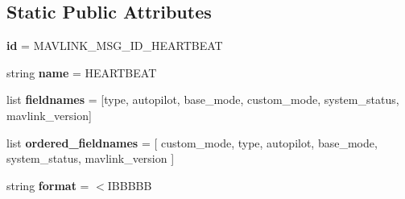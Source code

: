 \subsection*{Static Public Attributes}
\begin{DoxyCompactItemize}
\item 
\mbox{\label{classpymavlink_1_1dialects_1_1v10_1_1MAVLink__heartbeat__message_a91f87b960c3a9e12a26f72f2db11935c}} 
{\bfseries id} = M\+A\+V\+L\+I\+N\+K\+\_\+\+M\+S\+G\+\_\+\+I\+D\+\_\+\+H\+E\+A\+R\+T\+B\+E\+AT
\item 
\mbox{\label{classpymavlink_1_1dialects_1_1v10_1_1MAVLink__heartbeat__message_afca902f21545bd8da06b3c07fca1b1fc}} 
string {\bfseries name} = \textquotesingle{}H\+E\+A\+R\+T\+B\+E\+AT\textquotesingle{}
\item 
\mbox{\label{classpymavlink_1_1dialects_1_1v10_1_1MAVLink__heartbeat__message_a154ee4f4a434bb8640c4e555910a2add}} 
list {\bfseries fieldnames} = \mbox{[}\textquotesingle{}type\textquotesingle{}, \textquotesingle{}autopilot\textquotesingle{}, \textquotesingle{}base\+\_\+mode\textquotesingle{}, \textquotesingle{}custom\+\_\+mode\textquotesingle{}, \textquotesingle{}system\+\_\+status\textquotesingle{}, \textquotesingle{}mavlink\+\_\+version\textquotesingle{}\mbox{]}
\item 
\mbox{\label{classpymavlink_1_1dialects_1_1v10_1_1MAVLink__heartbeat__message_ab8c09614f9544aa75e9d26534cf92671}} 
list {\bfseries ordered\+\_\+fieldnames} = \mbox{[} \textquotesingle{}custom\+\_\+mode\textquotesingle{}, \textquotesingle{}type\textquotesingle{}, \textquotesingle{}autopilot\textquotesingle{}, \textquotesingle{}base\+\_\+mode\textquotesingle{}, \textquotesingle{}system\+\_\+status\textquotesingle{}, \textquotesingle{}mavlink\+\_\+version\textquotesingle{} \mbox{]}
\item 
\mbox{\label{classpymavlink_1_1dialects_1_1v10_1_1MAVLink__heartbeat__message_a8a200fb6824e12608212d97332936e8c}} 
string {\bfseries format} = \textquotesingle{}$<$I\+B\+B\+B\+BB\textquotesingle{}

\end{DoxyCompactItemize}
